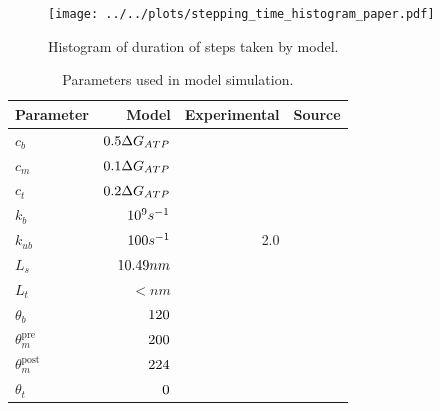 \documentclass[9pt,twocolumn,twoside,lineno]{pnas-new}
\begin{document}
\begin{figure}%
\centering
\texttt{[image: ../../plots/stepping\_time\_histogram\_paper.pdf]}
\caption{Histogram of duration of steps taken by model.}
\label{fig:timehist}
\end{figure}

\begin{table}%
\centering
\caption{Parameters used in model simulation.}
\begin{tabular}{lrrr}
Parameter & Model & Experimental & Source \\
\midrule
$c_b$ & $0.5 \Delta G_{ATP}$ &  & \\
$c_m$ & $0.1 \Delta G_{ATP}$ &  & \\
$c_t$ & $0.2 \Delta G_{ATP}$ &  & \\
$k_b$ & $10^{9} s^{-1}$&  & \\
$k_{ub}$ & $100 s^{-1}$ & 2.0 & \\
$L_s$ & $10.49 nm$ & \cite{nativestructure} & \\
$L_t$ & $\lt nm$ & \cite{nativestructure} & \\
$\theta_b$ & $120$ &  & \\
$\theta_m^{\mbox{pre}}$ & $200$ &  & \\
$\theta_m^{\mbox{post}}$ & $224$ &  & \\
$\theta_t$ & $0$ &  & \\

\bottomrule
\end{tabular}

\end{table}
\end{document}
